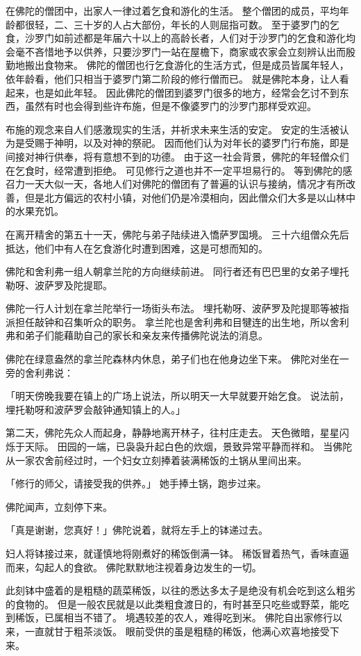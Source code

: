 \documentclass[twoside,openany]{book}
\begin{document}
在佛陀的僧团中，出家人一律过着乞食和游化的生活。
整个僧团的成员，平均年龄都很轻，二、三十岁的人占大部份，年长的人则屈指可数。
至于婆罗门的乞食，沙罗门如前述都是年届六十以上的高龄长者，人们对于沙罗门的乞食和游化均会毫不吝惜地予以供养，只要沙罗门一站在屋檐下，商家或农家会立刻辨认出而殷勤地搬出食物来。
佛陀的僧团也行乞食游化的生活方式，但是成员皆属年轻人，依年龄看，他们只相当于婆罗门第二阶段的修行僧而已。
就是佛陀本身，让人看起来，也是如此年轻。
因此佛陀的僧团到婆罗门很多的地方，经常会乞讨不到东西，虽然有时也会得到些许布施，但是不像婆罗门的沙罗门那样受欢迎。

布施的观念来自人们感激现实的生活，并祈求未来生活的安定。
安定的生活被认为是受赐于神明，以及对神的祭祀。
因而他们认为对年长的婆罗门行布施，即是间接对神行供奉，将有意想不到的功德。
由于这一社会背景，佛陀的年轻僧众们在乞食时，经常遭到拒绝。
可见修行之道也并不一定平坦易行的。
等到佛陀的感召力一天大似一天，各地人们对佛陀的僧团有了普遍的认识与接纳，情况才有所改善，但是北方偏远的农村小镇，对他们仍是冷漠相向，因此僧众们大多是以山林中的水果充饥。

在离开精舍的第五十一天，佛陀与弟子陆续进入憍萨罗国境。
三十六组僧众先后抵达，他们中有人在乞食游化时遭到困难，这是可想而知的。

佛陀和舍利弗一组人朝拿兰陀的方向继续前进。
同行者还有巴巴里的女弟子埋托勒呀、波萨罗及陀提耶。

佛陀一行人计划在拿兰陀举行一场街头布法。
埋托勒呀、波萨罗及陀提耶等被指派担任敲钟和召集听众的职务。
拿兰陀也是舍利弗和目犍连的出生地，所以舍利弗和弟子们能藉助自己的家长和亲友来传播佛陀说法的消息。

佛陀在绿意盎然的拿兰陀森林内休息，弟子们也在他身边坐下来。
佛陀对坐在一旁的舍利弗说：

「明天傍晚我要在镇上的广场上说法，所以明天一大早就要开始乞食。
说法前，埋托勒呀和波萨罗会敲钟通知镇上的人。」

第二天，佛陀先众人而起身，静静地离开林子，往村庄走去。
天色微暗，星星闪烁于天际。
田园的一端，已袅袅升起白色的炊烟，景致异常平静而祥和。
当佛陀从一家农舍前经过时，一个妇女立刻捧着装满稀饭的土锅从里间出来。

「修行的师父，请接受我的供养。」
她手捧土锅，跑步过来。

佛陀闻声，立刻停下来。

「真是谢谢，您真好！」佛陀说着，就将左手上的钵递过去。

妇人将钵接过来，就谨慎地将刚煮好的稀饭倒满一钵。
稀饭冒着热气，香味直逼而来，勾起人的食欲。
佛陀默默地注视着身边发生的一切。

此刻钵中盛着的是粗糙的蔬菜稀饭，以往的悉达多太子是绝没有机会吃到这么粗劣的食物的。
但是一般农民就是以此类粗食渡日的，有时甚至只吃些或野菜，能吃到稀饭，已属相当不错了。
境遇较差的农人，难得吃到米。
佛陀自出家修行以来，一直就甘于粗茶淡饭。
眼前受供的虽是粗糙的稀饭，他满心欢喜地接受下来。
\end{document}
